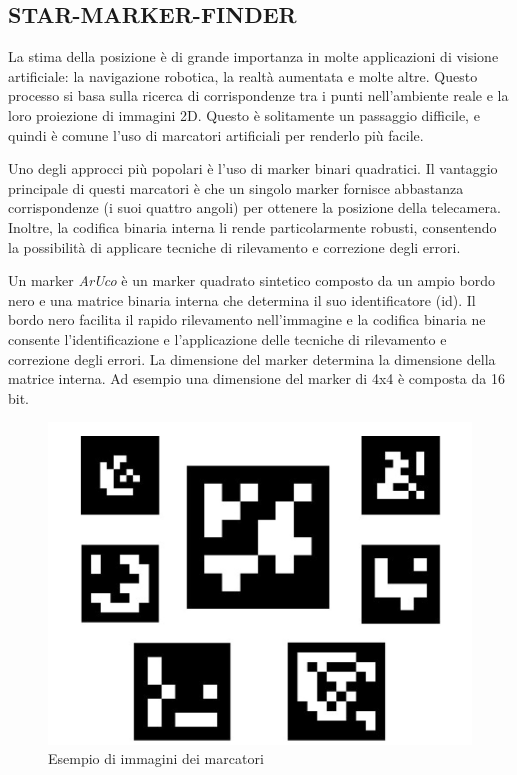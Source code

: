\documentclass[a4paper]{article}
\begin{document}
\subsection{STAR-MARKER-FINDER}
La stima della posizione è di grande importanza in molte applicazioni di visione artificiale: la navigazione robotica, la realtà aumentata e molte altre. Questo processo si basa sulla ricerca di corrispondenze tra i punti nell'ambiente reale e la loro proiezione di immagini 2D. Questo è solitamente un passaggio difficile, e quindi è comune l'uso di marcatori artificiali per renderlo più facile.

Uno degli approcci più popolari è l'uso di marker binari quadratici. Il vantaggio principale di questi marcatori è che un singolo marker fornisce abbastanza corrispondenze (i suoi quattro angoli) per ottenere la posizione della telecamera. Inoltre, la codifica binaria interna li rende particolarmente robusti, consentendo la possibilità di applicare tecniche di rilevamento e correzione degli errori.

Un marker \textit{ArUco} è un marker quadrato sintetico composto da un ampio bordo nero e una matrice binaria interna che determina il suo identificatore (id). Il bordo nero facilita il rapido rilevamento nell'immagine e la codifica binaria ne consente l'identificazione e l'applicazione delle tecniche di rilevamento e correzione degli errori. La dimensione del marker determina la dimensione della matrice interna. Ad esempio una dimensione del marker di 4x4 è composta da 16 bit.

\begin{figure}[htbp]
\centering
\includegraphics[scale=0.5]{marker_img.PNG} 
\caption{Esempio di immagini dei marcatori}
\end{figure}
\end{document}
